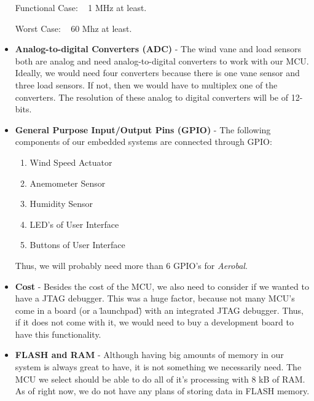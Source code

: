 \begin{itemize}
    Functional Case: ~ 1 MHz at least.

    Worst Case: ~ 60 Mhz at least.
 	
  	\item \textbf{Analog-to-digital Converters (ADC)} - The wind vane and load sensors both are analog and need analog-to-digital converters to work with our MCU. Ideally, we would need four converters because there is one vane sensor and three load sensors. If not, then we would have to multiplex one of the converters. The resolution of these analog to digital converters will be of 12-bits.
  	
  	\item \textbf{General Purpose Input/Output Pins (GPIO)} - The following components of our embedded systems are connected through GPIO: 
  	\begin{enumerate}  	
  	\item Wind Speed Actuator
  	\item Anemometer Sensor
  	\item Humidity Sensor
  	\item LED's of User Interface
  	\item Buttons of User Interface

  	\end{enumerate}
  	
  	Thus, we will probably need more than 6 GPIO's for \textit{Aerobal}. 
  	
	\item \textbf{Cost} - Besides the cost of the MCU, we also need to consider if we wanted to have a JTAG debugger. This was a huge factor, because not many MCU's come in a board (or a \"launchpad\") with an integrated JTAG debugger. Thus, if it does not come with it, we would need to buy a development board to have this functionality. 
	
	\item \textbf{FLASH and RAM} - Although having big amounts of memory in our system is always great to have, it is not something we necessarily need. The MCU we select should be able to do all of it's processing with 8 kB of RAM. As of right now, we do not have any plans of storing data in FLASH memory. 
	
\end{itemize}		
	
